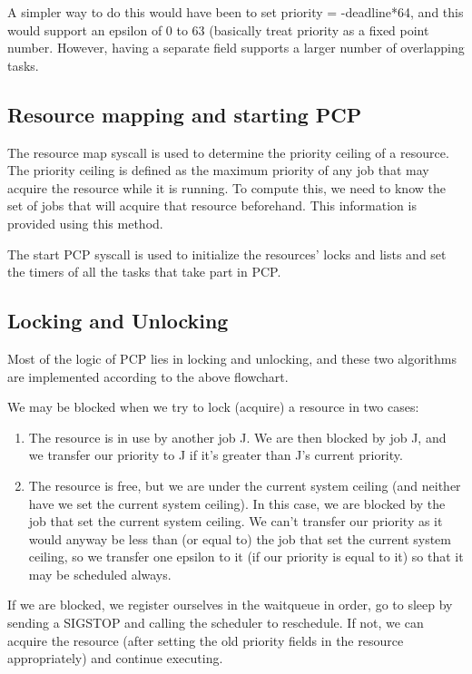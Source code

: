\documentclass[12pt]{article}
\begin{document}
A simpler way to do this would have been to set priority = -deadline*64, and this 
would support an epsilon of 0 to 63 (basically treat priority as a fixed point number. 
However, having a separate field supports a larger number of overlapping tasks.

\subsection{Resource mapping and starting PCP}

The resource map syscall is used to determine the priority ceiling of a resource.
The priority ceiling is defined as the maximum priority of any job that may
acquire the resource while it is running. To compute this, we need to know the 
set of jobs that will acquire that resource beforehand. This information is 
provided using this method.

The start PCP syscall is used to initialize the resources' locks and lists and 
set the timers of all the tasks that take part in PCP.

\subsection{Locking and Unlocking}

Most of the logic of PCP lies in locking and unlocking, and these two algorithms
are implemented according to the above flowchart.

We may be blocked when we try to lock (acquire) a resource in two cases:
\begin{enumerate}
    \item The resource is in use by another job J. We are then blocked by job J,
       and we transfer our priority to J if it's greater than J's current priority.
   \item The resource is free, but we are under the current system ceiling (and 
       neither have we set the current system ceiling). In this case, we are 
       blocked by the job that set the current system ceiling. We can't transfer 
       our priority as it would anyway be less than (or equal to) the job
       that set the current system ceiling, so we transfer one epsilon to it 
       (if our priority is equal to it) so that it may be scheduled always.
\end{enumerate}

If we are blocked, we register ourselves in the waitqueue in order, go to sleep by 
sending a SIGSTOP and calling the scheduler to reschedule. If not, we can 
acquire the resource (after setting the old priority fields in the resource 
appropriately) and continue executing.
\end{document}
